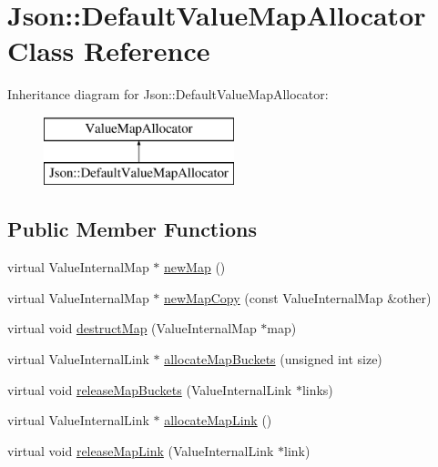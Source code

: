 \hypertarget{classJson_1_1DefaultValueMapAllocator}{}\section{Json\+:\+:Default\+Value\+Map\+Allocator Class Reference}
\label{classJson_1_1DefaultValueMapAllocator}
Inheritance diagram for Json\+:\+:Default\+Value\+Map\+Allocator\+:\begin{figure}[H]
\begin{center}
\leavevmode
\includegraphics[height=2.000000cm]{classJson_1_1DefaultValueMapAllocator}
\end{center}
\end{figure}
\subsection*{Public Member Functions}
\begin{DoxyCompactItemize}
\item 
virtual Value\+Internal\+Map $\ast$ \hyperlink{classJson_1_1DefaultValueMapAllocator_acffb887039c2eb07def0c75c4294ef81}{new\+Map} ()
\item 
virtual Value\+Internal\+Map $\ast$ \hyperlink{classJson_1_1DefaultValueMapAllocator_aac63732e7747debe8452431f6753d9cb}{new\+Map\+Copy} (const Value\+Internal\+Map \&other)
\item 
virtual void \hyperlink{classJson_1_1DefaultValueMapAllocator_ab6b20f1aa936ab2f23b8c4e4e8f72afd}{destruct\+Map} (Value\+Internal\+Map $\ast$map)
\item 
virtual Value\+Internal\+Link $\ast$ \hyperlink{classJson_1_1DefaultValueMapAllocator_a13d2ed971884a87bad1efdf20d4c0dc2}{allocate\+Map\+Buckets} (unsigned int size)
\item 
virtual void \hyperlink{classJson_1_1DefaultValueMapAllocator_aab37ecc63def9ff464feca12376d6d97}{release\+Map\+Buckets} (Value\+Internal\+Link $\ast$links)
\item 
virtual Value\+Internal\+Link $\ast$ \hyperlink{classJson_1_1DefaultValueMapAllocator_af63fd492b4dcd5efddec40aa23bfbd73}{allocate\+Map\+Link} ()
\item 
virtual void \hyperlink{classJson_1_1DefaultValueMapAllocator_ae93b651330bc67ad0b1f8bb59755c106}{release\+Map\+Link} (Value\+Internal\+Link $\ast$link)
\end{DoxyCompactItemize}



